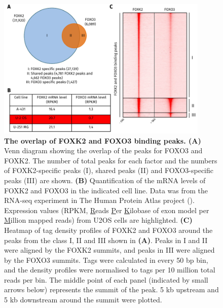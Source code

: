 \begin{figure}[!h]
    \centering
    \includegraphics[width=0.9\textwidth]{chapter3/figures_foxo3/fig42.pdf}
    \caption[The overlap of FOXK2 and FOXO3 binding peaks]{\textbf{The overlap of FOXK2 and FOXO3 binding peaks. (A)} Venn diagram showing the overlap of the peaks for FOXO3 and FOXK2. The number of total peaks for each factor and the numbers of FOXK2-specific peaks (I), shared peaks (II) and FOXO3-specific peaks (III) are shown. \textbf{(B)} Quantification of the mRNA levels of FOXK2 and FOXO3 in the indicated cell line. Data was from the RNA-seq experiment in The Human Protein Atlas project (\cite{uhlen2010towards}). Expression values (RPKM, \underline{R}eads \underline{P}er \underline{K}ilobase of exon model per \underline{M}illion mapped reads) from U2OS cells are highlighted. \textbf{(C)} Heatmap of tag density profiles of FOXK2 and FOXO3 around the peaks from the class I, II and III shown in \textbf{(A)}. Peaks in I and II were aligned by the FOXK2 summits, and peaks in III were aligned by the FOXO3 summits. Tags were calculated in every 50 bp bin, and the density profiles were normalised to tags per 10 million total reads per bin. The middle point of each panel (indicated by small arrows below) represents the summit of the peak. 5 kb upstream and 5 kb downstream around the summit were plotted.}
    \label{fig:fig42}
\end{figure}

